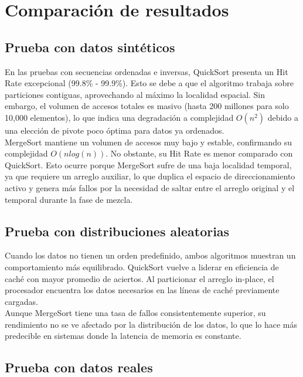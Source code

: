 \documentclass[12pt, a4paper]{article}
\begin{document}
	\section{Comparación de resultados}
	
	\subsection{Prueba con datos sintéticos}
	
	En las pruebas con secuencias ordenadas e inversas, QuickSort presenta un Hit Rate excepcional (99.8\% - 99.9\%). Esto se debe a que el algoritmo trabaja sobre particiones contiguas, aprovechando al máximo la localidad espacial. Sin embargo, el volumen de accesos totales es masivo (hasta 200 millones para solo 10,000 elementos), lo que indica una degradación a complejidad $O(n^2)$ debido a una elección de pivote poco óptima para datos ya ordenados.\\
	
	MergeSort mantiene un volumen de accesos muy bajo y estable, confirmando su complejidad $O(nlog(n))$. No obstante, su Hit Rate es menor comparado con QuickSort. Esto ocurre porque MergeSort sufre de una baja localidad temporal, ya que requiere un arreglo auxiliar, lo que duplica el espacio de direccionamiento activo y genera más fallos por la necesidad de saltar entre el arreglo original y el temporal durante la fase de mezcla.\\
	
	
	\subsection{Prueba con distribuciones aleatorias}
	
	Cuando los datos no tienen un orden predefinido, ambos algoritmos muestran un comportamiento más equilibrado. QuickSort vuelve a liderar en eficiencia de caché con mayor promedio de aciertos. Al particionar el arreglo in-place, el procesador encuentra los datos necesarios en las líneas de caché previamente cargadas.\\
	
	Aunque MergeSort tiene una tasa de fallos consistentemente superior, su rendimiento no se ve afectado por la distribución de los datos, lo que lo hace más predecible en sistemas donde la latencia de memoria es constante.\\
	
	\subsection{Prueba con datos reales}
	
\end{document}
